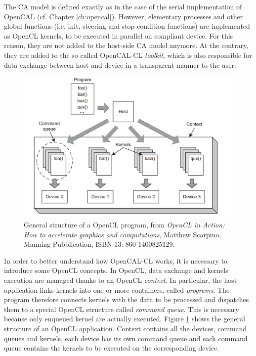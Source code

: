 The CA model is defined exactly as in the case of the serial
implementation of OpenCAL (cf. Chapter \ref{ch:opencal}). However,
elementary processes and other global functions (i.e. init, steering
and stop condition functions) are implemented as OpenCL kernels, to be
executed in parallel on compliant device. For this reason, they are
not added to the host-side CA model anymore. At the contrary, they are
added to the so called OpenCAL-CL \emph{toolkit}, which is also
responsible for data exchange between host and device in a transparent
manner to the user.

\begin{figure}[tp]
  \begin{center}
    \includegraphics[width=12cm]{./images/OpenCAL-CL/kernelDistribution}
    \caption{General structure of a OpenCL program, from \emph{OpenCL
        in Action: How to accelerate graphics and computations},
      Matthew Scarpino, Manning Pubblication, ISBN-13:
      860-1400825129.}
    \label{fig:GeneralStructure}
  \end{center}
\end{figure}

In order to better understand how OpenCAL-CL works, it is necessary to
introduce some OpenCL concepts. In OpenCL, data exchange and kernels
execution are managed thanks to an OpenCL \emph{context}. In
particular, the host application links kernels into one or more
containers, called \emph{programs}. The program therefore connects
kernels with the data to be processed and dispatches them to a special
OpenCL structure called \emph{command queue}. This is necessary
because only enqueued kernel are actually executed. Figure
\ref{fig:GeneralStructure} shows the general structure of an OpenCL
application. Context contains all the devices, command queues and
kernels, each device has its own command queue and each command queue
contains the kernels to be executed on the corresponding device.


